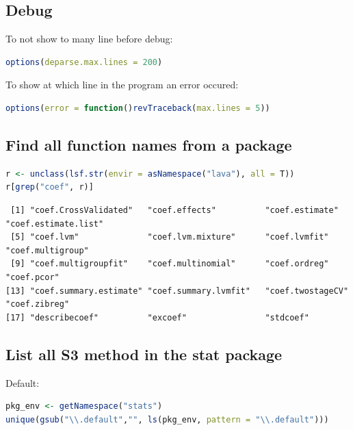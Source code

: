 \documentclass{article}
\begin{document}
\subsection{Debug}
\label{sec:org5c99c98}
To not show to many line before debug:
\begin{lstlisting}[language=r,numbers=none]
options(deparse.max.lines = 200)
\end{lstlisting}

To show at which line in the program an error occured:
\begin{lstlisting}[language=r,numbers=none]
options(error = function()revTraceback(max.lines = 5))
\end{lstlisting}
\subsection{Find all function names from a package}
\label{sec:org9cd9f8d}
\begin{lstlisting}[language=r,numbers=none]
r <- unclass(lsf.str(envir = asNamespace("lava"), all = T))
r[grep("coef", r)]
\end{lstlisting}

\label{}
\begin{verbatim}
 [1] "coef.CrossValidated"   "coef.effects"          "coef.estimate"         "coef.estimate.list"   
 [5] "coef.lvm"              "coef.lvm.mixture"      "coef.lvmfit"           "coef.multigroup"      
 [9] "coef.multigroupfit"    "coef.multinomial"      "coef.ordreg"           "coef.pcor"            
[13] "coef.summary.estimate" "coef.summary.lvmfit"   "coef.twostageCV"       "coef.zibreg"          
[17] "describecoef"          "excoef"                "stdcoef"
\end{verbatim}
\subsection{List all S3 method in the stat package}
\label{sec:org2a1bc73}

Default:
\begin{lstlisting}[language=r,numbers=none]
pkg_env <- getNamespace("stats")
unique(gsub("\\.default","", ls(pkg_env, pattern = "\\.default")))
\end{lstlisting}
\end{document}

